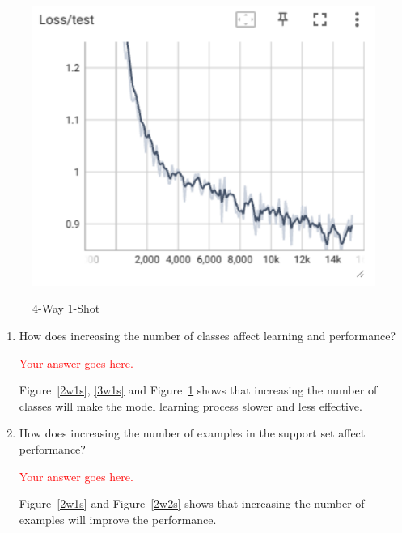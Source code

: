 \documentclass[12pt]{article}
\begin{document}
\begin{figure}[htbp]
\begin{minipage}{0.4\linewidth}
		\includegraphics[width=0.9\linewidth]{./figures/4w1s_test_loss.png}
		\label{pic three}%
	\end{minipage}
    \caption{4-Way 1-Shot}
    \label{4w1s}
    \end{figure}

\begin{enumerate}
    \item How does increasing the number of classes affect learning and performance?
    
    \textcolor{red}{Your answer goes here.}
    \newline
    
    Figure~\ref{2w1s}, \ref{3w1s} and Figure~\ref{4w1s} shows that increasing the number of classes will make the model learning process slower and less effective.
    
    \item How does increasing the number of examples in the support set affect performance?
    
   \textcolor{red}{Your answer goes here.}
   \newline

   Figure~\ref{2w1s} and Figure~\ref{2w2s} shows that increasing the number of examples will improve the performance.
    
\end{enumerate}
\end{document}
